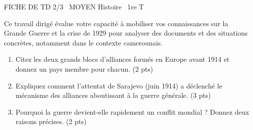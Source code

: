 \documentclass[11pt]{article}
\begin{document}
\begin{tcolorbox}[enhanced,colback=popink,colframe=popink,arc=10pt,boxrule=0pt,left=12pt,right=12pt,top=9pt,bottom=9pt]
{\color{white}\popxbold\small FICHE DE TD 2/3 \textbullet\ MOYEN \hfill Histoire \textbullet\ 1re T\par}
\end{tcolorbox}
\vspace{4pt}
Ce travail dirigé évalue votre capacité à mobiliser vos connaissances sur la Grande Guerre et la crise de 1929 pour analyser des documents et des situations concrètes, notamment dans le contexte camerounais.

\begin{exercice}
\begin{enumerate}
    \item Citez les deux grands blocs d'alliances formés en Europe avant 1914 et donnez un pays membre pour chacun. (2 pts)
    \item Expliquez comment l'attentat de Sarajevo (juin 1914) a déclenché le mécanisme des alliances aboutissant à la guerre générale. (3 pts)
    \item Pourquoi la guerre devient-elle rapidement un conflit mondial ? Donnez deux raisons précises. (2 pts)
\end{enumerate}
\end{exercice}
\end{document}
